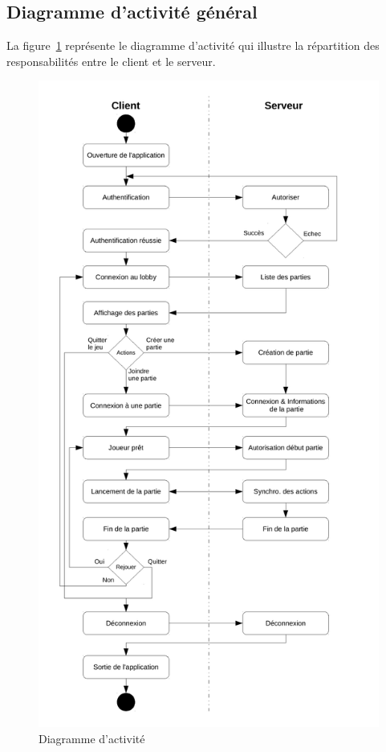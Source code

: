\documentclass[a4paper,11pt]{article}
\begin{document}
	\subsection{Diagramme d'activité général}
	La figure~\ref{fig:diagramme_activite} représente le diagramme d'activité qui illustre la répartition des responsabilités entre le client et le serveur.
	\begin{figure}[!ht]
		\centering
		\includegraphics[scale=0.6]{Diagramme_Activite.pdf}
		\caption{Diagramme d'activité}
		\label{fig:diagramme_activite}
	\end{figure}
	
\end{document}
